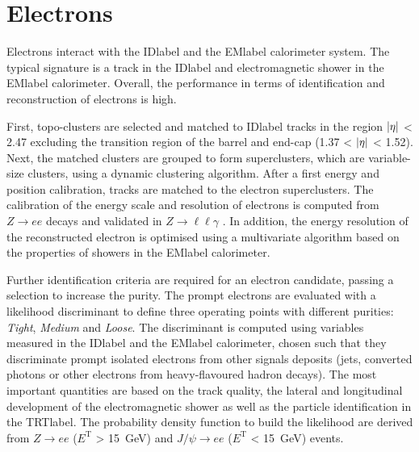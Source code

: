 \section{Electrons}

Electrons interact with the \acrshort{IDlabel} and the \acrshort{EMlabel} calorimeter system. The typical signature is a track in the \acrshort{IDlabel} and electromagnetic shower in the \acrshort{EMlabel} calorimeter. Overall, the performance in terms of identification and reconstruction of electrons is high.

First, topo-clusters are selected and matched to \acrshort{IDlabel} tracks in the region $\abs{\eta}$ < 2.47 excluding the transition region of the barrel and end-cap (1.37 < $\abs{\eta}$ < 1.52). Next, the matched clusters are grouped to form superclusters, which are variable-size clusters, using a dynamic clustering algorithm. After a first energy and position calibration, tracks are matched to the electron superclusters. The calibration of the energy scale and resolution of electrons is computed from $Z\rightarrow ee$ decays and validated in $Z\rightarrow \ell\ell\gamma$ %
. In addition, the energy resolution of the reconstructed electron is optimised using a multivariate algorithm based on the properties of showers in the \acrshort{EMlabel} calorimeter.

Further identification criteria are required for an electron candidate, passing a selection to increase the purity. The prompt electrons are evaluated with a likelihood discriminant to define three operating points with different purities: \textit{Tight}, \textit{Medium} and \textit{Loose}. The discriminant is computed using variables measured in the \acrshort{IDlabel} and the \acrshort{EMlabel} calorimeter, chosen such that they discriminate prompt isolated electrons from other signals deposits (jets, converted photons or other electrons from heavy-flavoured hadron decays). The most important quantities are based on the track quality, the lateral and longitudinal development of the electromagnetic shower as well as the particle identification in the \acrshort{TRTlabel}. The probability density function to build the likelihood are derived from $Z\rightarrow ee$ ($E^\text{T}$ > 15~GeV) and $J/\psi \rightarrow ee$ ($E^\text{T}$ < 15~GeV) events.

